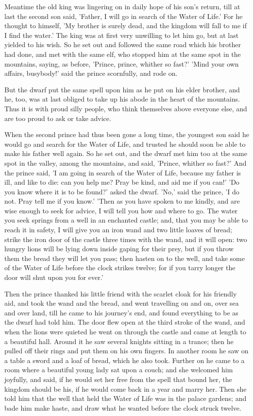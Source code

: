 \documentclass[12pt]{book}
\begin{document}
Meantime the old king was lingering on in daily hope of his son's
return, till at last the second son said, 'Father, I will go in search
of the Water of Life.' For he thought to himself, 'My brother is
surely dead, and the kingdom will fall to me if I find the water.' The
king was at first very unwilling to let him go, but at last yielded to
his wish. So he set out and followed the same road which his brother
had done, and met with the same elf, who stopped him at the same spot
in the mountains, saying, as before, 'Prince, prince, whither so
fast?' 'Mind your own affairs, busybody!' said the prince scornfully,
and rode on.

But the dwarf put the same spell upon him as he put on his elder
brother, and he, too, was at last obliged to take up his abode in the
heart of the mountains. Thus it is with proud silly people, who think
themselves above everyone else, and are too proud to ask or take
advice.

When the second prince had thus been gone a long time, the youngest
son said he would go and search for the Water of Life, and trusted he
should soon be able to make his father well again. So he set out, and
the dwarf met him too at the same spot in the valley, among the
mountains, and said, 'Prince, whither so fast?' And the prince said,
'I am going in search of the Water of Life, because my father is ill,
and like to die: can you help me? Pray be kind, and aid me if you
can!' 'Do you know where it is to be found?' asked the dwarf. 'No,'
said the prince, 'I do not. Pray tell me if you know.' 'Then as you
have spoken to me kindly, and are wise enough to seek for advice, I
will tell you how and where to go. The water you seek springs from a
well in an enchanted castle; and, that you may be able to reach it in
safety, I will give you an iron wand and two little loaves of bread;
strike the iron door of the castle three times with the wand, and it
will open: two hungry lions will be lying down inside gaping for their
prey, but if you throw them the bread they will let you pass; then
hasten on to the well, and take some of the Water of Life before the
clock strikes twelve; for if you tarry longer the door will shut upon
you for ever.'

Then the prince thanked his little friend with the scarlet cloak for
his friendly aid, and took the wand and the bread, and went travelling
on and on, over sea and over land, till he came to his journey's end,
and found everything to be as the dwarf had told him. The door flew
open at the third stroke of the wand, and when the lions were quieted
he went on through the castle and came at length to a beautiful hall.
Around it he saw several knights sitting in a trance; then he pulled
off their rings and put them on his own fingers. In another room he
saw on a table a sword and a loaf of bread, which he also took.
Further on he came to a room where a beautiful young lady sat upon a
couch; and she welcomed him joyfully, and said, if he would set her
free from the spell that bound her, the kingdom should be his, if he
would come back in a year and marry her. Then she told him that the
well that held the Water of Life was in the palace gardens; and bade
him make haste, and draw what he wanted before the clock struck
twelve.
\end{document}
